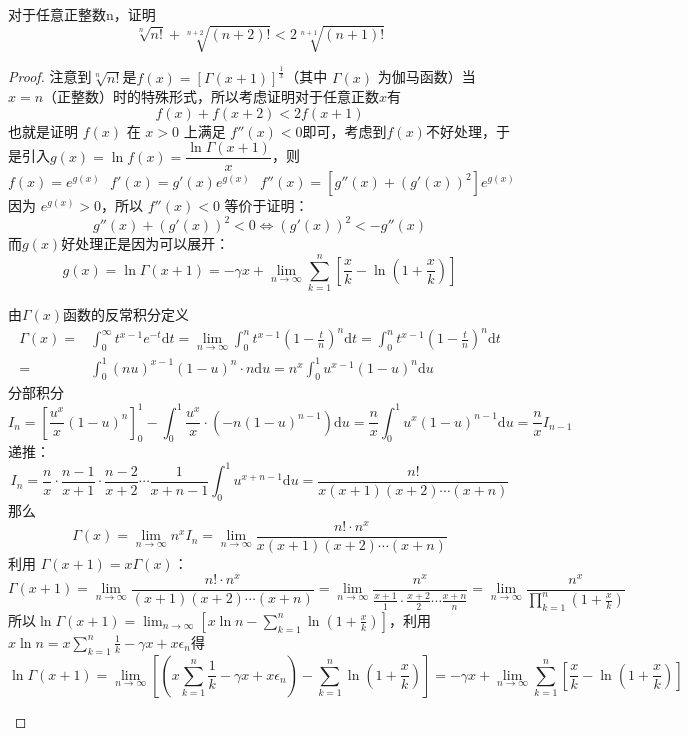 \begin{example}[群题]
    对于任意正整数n，证明\[\sqrt[n]{n!} + \sqrt[n+2]{(n+2)!} < 2\sqrt[n+1]{(n+1)!}\]
\end{example}
\begin{proof}
注意到$\sqrt[n]{n!}$是$f(x) = \left[\Gamma(x+1)\right]^{\frac1x}$（其中 $\Gamma(x)$ 为伽马函数）当 $x = n$（正整数）时的特殊形式，所以考虑证明对于任意正数$x$有\[f(x) + f(x+2) < 2f(x+1)\]也就是证明 $f(x)$ 在 $x > 0$ 上满足 $f''(x) < 0$即可，考虑到$f(x)$不好处理，于是引入$g(x)=\ln f(x)=\dfrac{\ln \Gamma(x+1)}{x}$，则
\[f(x) = e^{g(x)}~~~f'(x) = g'(x) e^{g(x)}~~~f''(x) = \left[g''(x) + (g'(x))^2\right] e^{g(x)}\]
因为 $e^{g(x)} > 0$，所以 $f''(x) < 0$ 等价于证明：$$g''(x) + (g'(x))^2 < 0 \iff (g'(x))^2 < -g''(x)$$
而$g(x)$好处理正是因为可以展开：
\[g(x)=\ln \Gamma(x+1) = -\gamma x + \lim_{n \to \infty} \sum_{k=1}^n \left[ \frac{x}{k} - \ln\left(1 + \frac{x}{k}\right) \right]\]
\begin{note}
由$\Gamma(x)$函数的反常积分定义
\begin{align*}
\Gamma(x) =& \int_0^\infty t^{x-1} e^{-t} \mathrm dt= \lim_{n \to \infty} \int_0^n t^{x-1} \left(1 - \frac{t}{n}\right)^n \mathrm dt=\int_0^n t^{x-1} \left(1 - \frac{t}{n}\right)^n \mathrm dt \\=& \int_0^1 (nu)^{x-1} (1-u)^n \cdot n \mathrm du= n^x \int_0^1 u^{x-1} (1-u)^n \mathrm du\end{align*}
分部积分
$$I_n = \left[ \frac{u^x}{x} (1-u)^n \right]_0^1 - \int_0^1 \frac{u^x}{x} \cdot \left( -n(1-u)^{n-1} \right) \mathrm du= \frac{n}{x} \int_0^1 u^x (1-u)^{n-1} \mathrm du = \frac{n}{x} I_{n-1}$$
递推：$$I_n = \frac{n}{x} \cdot \frac{n-1}{x+1} \cdot \frac{n-2}{x+2} \cdots \frac{1}{x+n-1} \int_0^1 u^{x+n-1} \mathrm du=\frac{n!}{x(x+1)(x+2)\cdots(x+n)}$$
那么$$\Gamma(x) = \lim_{n \to \infty} n^x I_n = \lim_{n \to \infty} \frac{n! \cdot n^x}{x(x+1)(x+2)\cdots(x+n)}$$
利用 $\Gamma(x+1) = x\Gamma(x)$：
$$\Gamma(x+1) = \lim_{n \to \infty} \frac{n! \cdot n^x}{(x+1)(x+2)\cdots(x+n)}= \lim_{n \to \infty} \frac{n^x}{\frac{x+1}{1} \cdot \frac{x+2}{2} \cdots \frac{x+n}{n}} = \lim_{n \to \infty} \frac{n^x}{\prod_{k=1}^n \left(1 + \frac{x}{k}\right)}$$
所以$\displaystyle\ln \Gamma(x+1) = \lim_{n \to \infty} \left[ x \ln n - \sum_{k=1}^n \ln\left(1 + \frac{x}{k}\right) \right]$，利用$\displaystyle x \ln n = x \sum_{k=1}^n \frac{1}{k} - \gamma x + x \epsilon_n$得
\[\ln \Gamma(x+1) = \lim_{n \to \infty} \left[ \left( x \sum_{k=1}^n \frac{1}{k} - \gamma x + x \epsilon_n \right) - \sum_{k=1}^n \ln\left(1 + \frac{x}{k}\right) \right]= -\gamma x + \lim_{n \to \infty} \sum_{k=1}^n \left[ \frac{x}{k} - \ln\left(1 + \frac{x}{k}\right) \right]\]

\end{note}
\end{proof}
